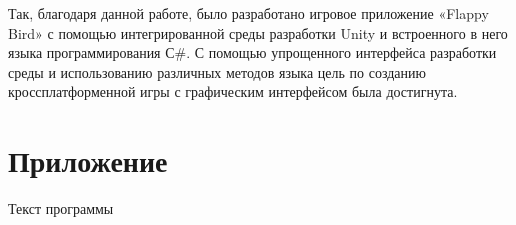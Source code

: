 \documentclass[14pt, oneside]{altsu-report}
\begin{document}
Так, благодаря данной работе, было разработано игровое приложение «Flappy Bird» с помощью интегрированной среды разработки Unity и встроенного в него языка программирования С\#. С помощью упрощенного интерфейса разработки среды и использованию различных методов языка цель по созданию кроссплатформенной игры с графическим интерфейсом была достигнута.

\newpage
{}
\printbibliography[title={Список использованной литературы}]

\appendix
\newpage
\chapter*{\raggedleft\label{appendix1}Приложение}

\begin{center}
\label{code:appendix}Текст программы
\end{center}
\end{document}
